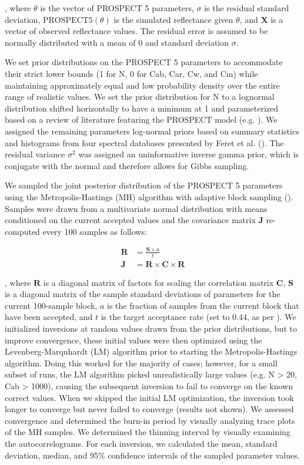 , where $\theta$ is the vector of PROSPECT 5 parameters, $\sigma$ is the 
residual standard deviation, $\mathrm{PROSPECT 5}(\theta)$ is the simulated
reflectance given $\theta$, and $\mathbf{X}$ is a vector of observed 
reflectance values. The residual error is assumed to be normally distributed 
with a mean of 0 and standard deviation $\sigma$. 

We set prior distributions on the PROSPECT 5 parameters to accommodate their
strict lower bounds (1 for N, 0 for Cab, Car, Cw, and Cm) while maintaining
approximately equal and low probability density over the entire range of
realistic values. We set the prior distribution for N to a lognormal
distribution shifted horizontally to have a minimum at 1 and parameterized
based on a review of literature featuring the PROSPECT model (e.g.
\cite{LeMaire2004,Ferreira2013,Croft2014}). We assigned the remaining
parameters log-normal priors based on summary statistics and histograms from
four spectral databases presented by Feret et al. (\cite{Feret2008}). The
residual variance $\sigma^2$ was assigned an uninformative inverse gamma
prior, which is conjugate with the normal and therefore allows for Gibbs
sampling.

We sampled the joint posterior distribution of the PROSPECT 5 parameters using
the Metropolis-Hastings (MH) algorithm with adaptive block sampling
(\cite{Haario2001}). Samples were drawn from a multivariate normal
distribution with means conditioned on the current accepted values and the
covariance matrix $\mathbf{J}$ re-computed every 100 samples as follows:

\begin{align}
    \mathbf{R} &= \frac{\mathbf{S} \times a}{t} \\
    \mathbf{J} &= \mathbf{R} \times \mathbf{C} \times \mathbf{R}
\end{align}

, where $\mathbf{R}$ is a diagonal matrix of factors for scaling the 
correlation matrix $\mathbf{C}$, $\mathbf{S}$ is a diagonal matrix of the 
sample standard deviations of parameters for the current 100-sample block, $a$ 
is the fraction of samples from the current block that have been accepted, and
$t$ is the target acceptance rate (set to 0.44, as per \cite{Haario2001}).  We
initialized inversions at random values drawn from the prior distributions,
but to improve convergence, these initial values were then optimized using the
Levenberg-Marquhardt (LM) algorithm prior to starting the Metropolis-Hastings
algorithm. Doing this worked for the majority of cases; however, for a small
subset of runs, the LM algorithm picked unrealistically large values (e.g. N >
20, Cab > 1000), causing the subsequent inversion to fail to converge on the
known correct values. When we skipped the initial LM optimization, the
inversion took longer to converge but never failed to converge (results not
shown). We assessed convergence and determined the burn-in period by visually
analyzing trace plots of the MH samples. We determined the thinning interval
by visually examining the autocorrelograms.  For each inversion, we calculated
the mean, standard deviation, median, and 95\% confidence intervals of the
sampled parameter values.  

